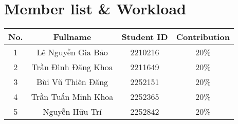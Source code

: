 \section{Member list \& Workload}

\begin{center}
\begin{tabular}{|c|c|c|c|}
\hline
\textbf{No.} & \textbf{Fullname} & \textbf{Student ID} & \textbf{Contribution}\\
\hline 
\multirow{1}{*}{1} & \multirow{1}{*}{Lê Nguyễn Gia Bảo} & \multirow{1}{*}{2210216} & \multirow{1}{*}{20\%}\\
\hline 
\multirow{1}{*}{2} & \multirow{1}{*}{Trần Đình Đăng Khoa} & \multirow{1}{*}{2211649} & \multirow{1}{*}{20\%}\\
\hline
\multirow{1}{*}{3} & \multirow{1}{*}{Bùi Vũ Thiên Đăng} & \multirow{1}{*}{2252151} & \multirow{1}{*}{20\%}\\
\hline
\multirow{1}{*}{4} & \multirow{1}{*}{Trần Tuấn Minh Khoa} & \multirow{1}{*}{2252365} & \multirow{1}{*}{20\%}\\
\hline
\multirow{1}{*}{5} & \multirow{1}{*}{Nguyễn Hữu Trí} & \multirow{1}{*}{2252842} & \multirow{1}{*}{20\%}\\
\hline
\end{tabular}
\end{center}
